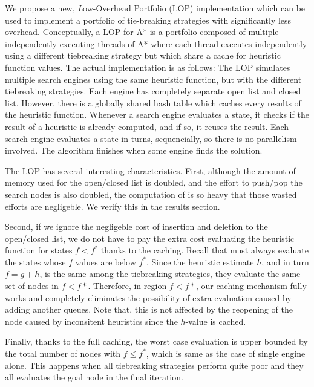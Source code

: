 We propose a new, {\emph Low-Overhead Portfolio} (LOP) implementation which can be used to implement a portfolio of tie-breaking strategies with significantly less overhead.
Conceptually, a LOP for A* is a portfolio composed of multiple independently executing threads of A*  where each thread  executes independently using a different tiebreaking strategy but which share a cache for heuristic function values.
The actual implementation is as follows:
The LOP simulates
multiple search engines using the same heuristic function, but with the
different tiebreaking strategies.  Each engine has completely separate
open list and closed list.  However, there is a globally shared hash
table which caches every results of the heuristic function.  Whenever a
search engine evaluates a state, it checks if the result of a heuristic is
already computed, and if so, it reuses the result.  Each search engine
evaluates a state in turns, sequencially, so there is no parallelism
involved. The algorithm finishes when some engine finds the solution.


The LOP has several interesting characteristics.  First,
although the amount of memory used for the open/closed list is doubled,
and the effort to push/pop the search nodes is also doubled, the
computation of \lmcut is so heavy that those wasted efforts are
negligeble.  We verify this in the results section.

Second, if we ignore the negligeble cost of insertion and deletion to
the open/closed list, we do not have to pay the extra cost evaluating
the heuristic function for states $f<f^*$ thanks to the caching.
Recall that \astar must always evaluate the states whose $f$ values are
below $f^*$. Since the heuristic estimate $h$, and in turn $f=g+h$, is
the same among the tiebreaking strategies, they evaluate the same set of
nodes in $f<f*$.  Therefore, in region $f<f*$, our caching mechanism
fully works and completely eliminates the possibility of extra
evaluation caused by adding another queues.  Note that, this is not
affected by the reopening of the node caused by inconsitent heuristics
since the $h$-value is cached.

Finally, thanks to the full caching, the worst case evaluation is upper
bounded by the total number of nodes with $f\leq f^*$, which is same as
the case of single engine alone. This happens when all tiebreaking
strategies perform quite poor and they all evaluates the goal node in the
final iteration.

